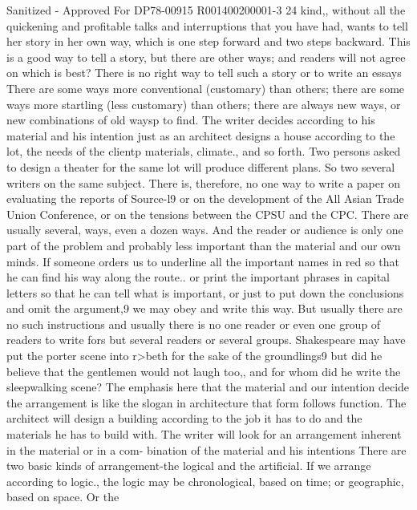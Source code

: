 \documentclass[
    oneside,
    11pt,
    draft
]{memoir}
\begin{document}
Sanitized - Approved For DP78-00915 R001400200001-3 24 kind,, without all the quickening and profitable talks and interruptions that you have had, wants to tell her story in her own way, which is one step forward and two steps backward. This is a good way to tell a story, but there are other ways; and readers will not agree on which is best? There is no right way to tell such a story or to write an essays There are some ways more conventional (customary) than others; there are some ways more startling (less customary) than others; there are always new ways, or new combinations of old waysp to find. The writer decides according to his material and his intention just as an architect designs a house according to the lot, the needs of the clientp materials, climate., and so forth. Two persons asked to design a theater for the same lot will produce different plans. So two several writers on the same subject. There is, therefore, no one way to write a paper on evaluating the reports of Source-l9 or on the development of the All Asian Trade Union Conference, or on the tensions between the CPSU and the CPC. There are usually several, ways, even a dozen ways. And the reader or audience is only one part of the problem and probably less important than the material and our own minds. If someone orders us to underline all the important names in red so that he can find his way along the route.. or print the important phrases in capital letters so that he can tell what is important, or just to put down the conclusions and omit the argument,9 we may obey and write this way. But usually there are no such instructions and usually there is no one reader or even one group of readers to write fors but several readers or several groups. Shakespeare may have put the porter scene into r>beth for the sake of the groundlings9 but did he believe that the gentlemen would not laugh too,, and for whom did he write the sleepwalking scene? The emphasis here that the material and our intention decide the arrangement is like the slogan in architecture that form follows function. The architect will design a building according to the job it has to do and the materials he has to build with. The writer will look for an arrangement inherent in the material or in a com- bination of the material and his intentions There are two basic kinds of arrangement-the logical and the artificial. If we arrange according to logic., the logic may be chronological, based on time; or geographic, based on space. Or the
\end{document}
